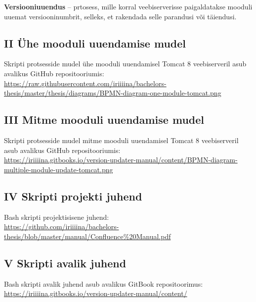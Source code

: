 \documentclass[12pt]{article}
\begin{document}
  \textbf{Versiooniuuendus} \--- prtosess, mille korral veebiserverisse paigaldatakse mooduli uuemat versiooninumbrit, selleks, et rakendada selle parandusi või täiendusi.\\
  
  \subsection*{II Ühe mooduli uuendamise mudel}
  \label{bpmn-one}
  
  Skripti protsesside mudel ühe mooduli uuendamisel Tomcat 8 veebiserveril asub avalikus GitHub repositooriumis:\\
  \url{https://raw.githubusercontent.com/iriiiina/bachelors-thesis/master/thesis/diagrams/BPMN-diagram-one-module-tomcat.png}
  
  \subsection*{III Mitme mooduli uuendamise mudel}
  \label{bpmn-many}
  
  Skripti protsesside mudel mitme mooduli uuendamisel Tomcat 8 veebiserveril asub avalikus GitHub repositooriumis:\\
  \url{https://iriiiina.gitbooks.io/version-updater-manual/content/BPMN-diagram-multiple-module-update-tomcat.png}
  
  \subsection*{IV Skripti projekti juhend}
  \label{documentation}
  
  Bash skripti projektisisene juhend:\\
  \url{https://github.com/iriiiina/bachelors-thesis/blob/master/manual/Confluence%20Manual.pdf}
  
  \subsection*{V Skripti avalik juhend}
  \label{public-documentation}
  
  Bash skripti avalik juhend asub avalikus GitBook repositoorimus:\\
  \url{https://iriiiina.gitbooks.io/version-updater-manual/content/}
  
\end{document}
